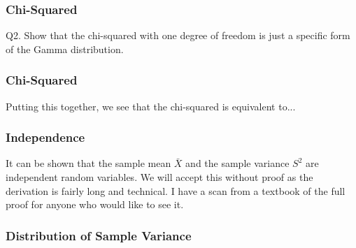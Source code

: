 \documentclass{beamer}
\begin{document}
\begin{frame}
\frametitle{Chi-Squared}

Q2. Show that the chi-squared with one degree of freedom is just a specific form of
the Gamma distribution. 

\end{frame}

\begin{frame}
\frametitle{Chi-Squared}

Putting this together, we see that the chi-squared is equivalent to...

\end{frame}


\begin{frame}
\frametitle{Independence}

It can be shown that the sample mean $\bar{X}$ and the sample variance $S^2$
are independent random variables. We will accept this without proof as the
derivation is fairly long and technical. I have a scan from a textbook of
the full proof for anyone who would like to see it.

\end{frame}

\begin{frame}
\frametitle{Distribution of Sample Variance}



\end{frame}
\end{document}
